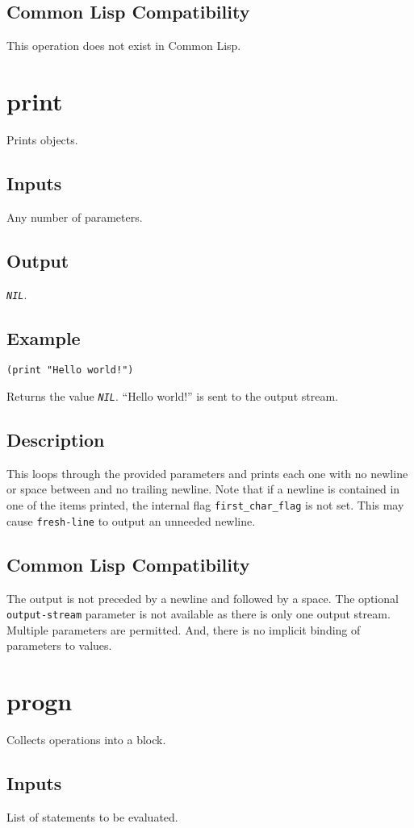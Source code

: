 \documentclass[10pt, openany]{book}
\newcommand{\constant}[1]{\emph{\texttt{#1}}}
\newcommand{\keyword}[1]{\texttt{#1}}
\newcommand{\cl}{Common Lisp}
\begin{document}
\subsection{Common Lisp Compatibility}
This operation does not exist in \cl.

\section{print}
Prints objects.
\subsection{Inputs}
Any number of parameters.
\subsection{Output}
\constant{NIL}.
\subsection{Example}
\begin{lstlisting}
(print "Hello world!")
\end{lstlisting}
Returns the value \constant{NIL}.  ``Hello world!'' is sent to the output stream.
\subsection{Description}
This loops through the provided parameters and prints each one with no newline or space between and no trailing newline.  Note that if a newline is contained in one of the items printed, the internal flag \keyword{first\_char\_flag} is not set.  This may cause \keyword{fresh-line} to output an unneeded newline.
\subsection{Common Lisp Compatibility}
The output is not preceded by a newline and followed by a space.  The optional \keyword{output-stream} parameter is not available as there is only one output stream.  Multiple parameters are permitted.  And, there is no implicit binding of parameters to values.

\section{progn}
Collects operations into a block.
\subsection{Inputs}
List of statements to be evaluated.
\end{document}
